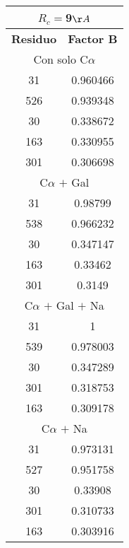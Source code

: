 \begin{tabular}[c]{|c|c|}
\multicolumn{2}{c}{$R_c=$9$\AA$}\\\hline
\textbf{Residuo}&\textbf{Factor B}\\\hline
\multicolumn{2}{c}{Con solo C$\alpha$}\\\hline
        31&  0.960466\\
       526&  0.939348\\
        30&  0.338672\\
       163&  0.330955\\
       301&  0.306698\\
\hline
\multicolumn{2}{c}{C$\alpha$ $+$ Gal}\\\hline
        31&   0.98799\\
       538&  0.966232\\
        30&  0.347147\\
       163&   0.33462\\
       301&    0.3149\\
\hline
\multicolumn{2}{c}{C$\alpha$ $+$ Gal $+$ Na}\\\hline
        31&         1\\
       539&  0.978003\\
        30&  0.347289\\
       301&  0.318753\\
       163&  0.309178\\
\hline
\multicolumn{2}{c}{C$\alpha$ $+$ Na}\\\hline
        31&  0.973131\\
       527&  0.951758\\
        30&   0.33908\\
       301&  0.310733\\
       163&  0.303916\\
\hline
\end{tabular}
